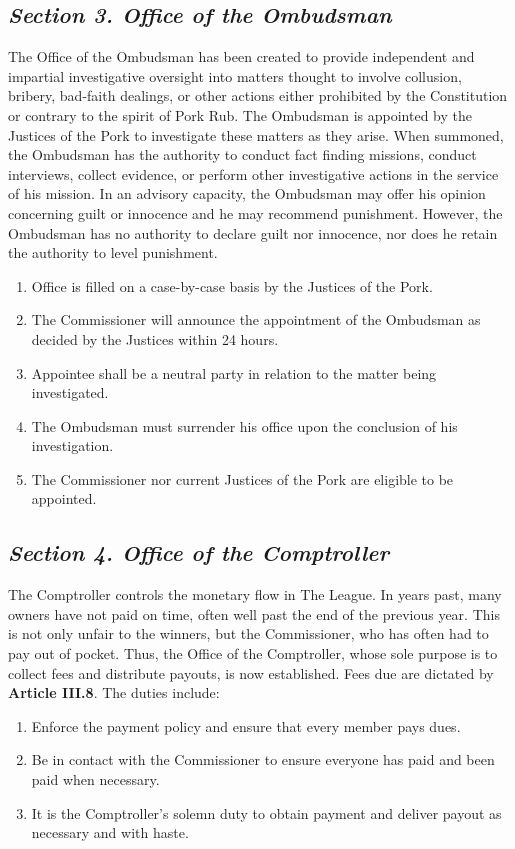 \documentclass{article}
\begin{document}
    \subsection*{\textit{Section 3. Office of the Ombudsman}}
    The Office of the Ombudsman has been created to provide independent and impartial investigative oversight into matters thought to involve collusion, bribery, bad-faith dealings, or other actions either prohibited by the Constitution or contrary to the spirit of Pork Rub. The Ombudsman is appointed by the Justices of the Pork to investigate these matters as they arise. When summoned, the Ombudsman has the authority to conduct fact finding missions, conduct interviews, collect evidence, or perform other investigative actions in the service of his mission. In an advisory capacity, the Ombudsman may offer his opinion concerning guilt or innocence and he may recommend punishment. However, the Ombudsman has no authority to declare guilt nor innocence, nor does he retain the authority to level punishment.
    \begin{enumerate}[label=\Alph*)]
        \item Office is filled on a case-by-case basis by the Justices of the Pork.
        \item The Commissioner will announce the appointment of the Ombudsman as decided by the Justices within 24 hours.
        \item Appointee shall be a neutral party in relation to the matter being investigated.
        \item The Ombudsman must surrender his office upon the conclusion of his investigation.
        \item The Commissioner nor current Justices of the Pork are eligible to be appointed.
    \end{enumerate}
    \subsection*{\textit{Section 4. Office of the Comptroller}}
    The Comptroller controls the monetary flow in The League. In years past, many owners have not paid on time, often well past the end of the previous year. This is not only unfair to the winners, but the Commissioner, who has often had to pay out of pocket. Thus, the Office of the Comptroller, whose sole purpose is to collect fees and distribute payouts, is now established. Fees due are dictated by \textbf{Article III.8}. The duties include:
    \begin{enumerate}[label=\Alph*)]
        \item Enforce the payment policy and ensure that every member pays dues.
        \item Be in contact with the Commissioner to ensure everyone has paid and been paid when necessary.
        \item It is the Comptroller’s solemn duty to obtain payment and deliver payout as necessary and with haste.
    \end{enumerate}
\end{document}
